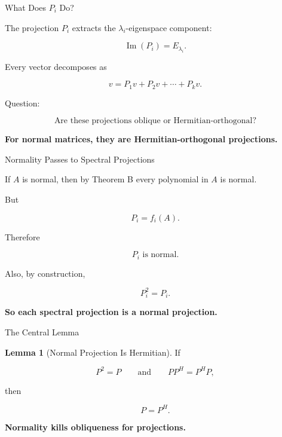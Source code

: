 \documentclass[10pt]{beamer}
\theoremstyle{definition}
\newtheorem{lem}{Lemma}[section]
\newcommand{\x}[1]{\alert{\textbf{#1}}}
\begin{document}
\begin{frame}{What Does $P_i$ Do?}

The projection $P_i$ extracts the $\lambda_i$-eigenspace component:

$$
\operatorname{Im}(P_i)=E_{\lambda_i}.
$$

\vfill

Every vector decomposes as

$$
v=P_1v+P_2v+\cdots+P_kv.
$$

\vfill

Question:

$$
\boxed{\text{Are these projections oblique or Hermitian-orthogonal?}}
$$

\vfill

\begin{center}
\x{For normal matrices, they are Hermitian-orthogonal projections.}
\end{center}

\end{frame}

\begin{frame}{Normality Passes to Spectral Projections}

If $A$ is normal, then by Theorem B every polynomial in $A$ is normal.

\vfill

But

$$
P_i=f_i(A).
$$

\vfill

Therefore

$$
\boxed{P_i\text{ is normal}.}
$$

\vfill

Also, by construction,

$$
P_i^2=P_i.
$$

\vfill

\begin{center}
\x{So each spectral projection is a normal projection.}
\end{center}

\end{frame}

\begin{frame}{The Central Lemma}

\begin{lem}[Normal Projection Is Hermitian]
If

$$
P^2=P
\qquad\text{and}\qquad
PP^H=P^HP,
$$

then

$$
P=P^H.
$$
\end{lem}

\vfill

\begin{center}
\x{Normality kills obliqueness for projections.}
\end{center}

\end{frame}
\end{document}
